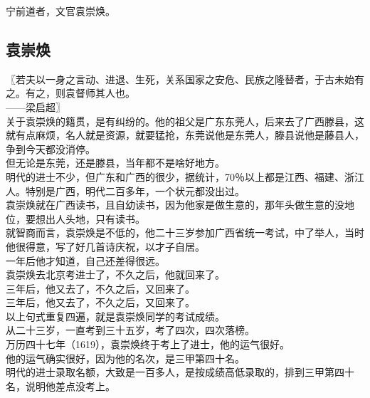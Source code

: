 \begin{multicols}{\theparacolNo}
宁前道者，文官袁崇焕。\\

\subsection{袁崇焕}
〖若夫以一身之言动、进退、生死，关系国家之安危、民族之隆替者，于古未始有之。有之，则袁督师其人也。\\

——梁启超〗\\

关于袁崇焕的籍贯，是有纠纷的。他的祖父是广东东莞人，后来去了广西滕县，这就有点麻烦，名人就是资源，就要猛抢，东莞说他是东莞人，滕县说他是藤县人，争到今天都没消停。\\

但无论是东莞，还是滕县，当年都不是啥好地方。\\

明代的进士不少，但广东和广西的很少，据统计，70％以上都是江西、福建、浙江人。特别是广西，明代二百多年，一个状元都没出过。\\

袁崇焕就在广西读书，且自幼读书，因为他家是做生意的，那年头做生意的没地位，要想出人头地，只有读书。\\

就智商而言，袁崇焕是不低的，他二十三岁参加广西省统一考试，中了举人，当时他很得意，写了好几首诗庆祝，以才子自居。\\

一年后他才知道，自己还差得很远。\\

袁崇焕去北京考进士了，不久之后，他就回来了。\\

三年后，他又去了，不久之后，又回来了。\\

三年后，他又去了，不久之后，又回来了。\\

以上句式重复四遍，就是袁崇焕同学的考试成绩。\\

从二十三岁，一直考到三十五岁，考了四次，四次落榜。\\

万历四十七年（1619），袁崇焕终于考上了进士，他的运气很好。\\

他的运气确实很好，因为他的名次，是三甲第四十名。\\

明代的进士录取名额，大致是一百多人，是按成绩高低录取的，排到三甲第四十名，说明他差点没考上。\\


\end{multicols}
